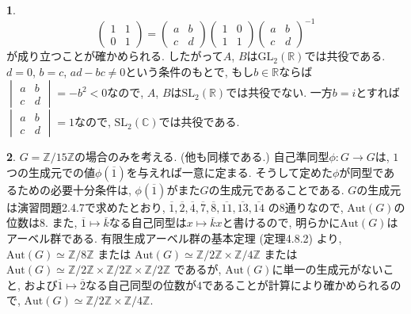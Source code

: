 \documentclass{article}
\theoremstyle{definition}
\newtheorem{ans}{}
\numberwithin{ans}{subsection}
\newcommand{\Z}[1]{\mathbb{Z}/#1\mathbb{Z}}
\begin{document}
\begin{ans}
  \[
    \begin{pmatrix}
      1 & 1 \\
      0 & 1
    \end{pmatrix} = \begin{pmatrix}
      a & b \\
      c & d
    \end{pmatrix} \begin{pmatrix}
      1 & 0 \\
      1 & 1
    \end{pmatrix} \begin{pmatrix}
      a & b \\
      c & d
    \end{pmatrix}^{-1}
  \]
  が成り立つことが確かめられる.
  したがって$A$, $B$は$\mathrm{GL}_2(\mathbb{R})$では共役である.
  $d = 0$, $b = c$, $ad - bc \neq 0$という条件のもとで, もし$b \in \mathbb{R}$ならば$
  \begin{vmatrix}
    a & b \\
    c & d
  \end{vmatrix} = - b^2 < 0
  $なので, $A$, $B$は$\mathrm{SL}_2(\mathbb{R})$では共役でない.
  一方$b = i$とすれば$
  \begin{vmatrix}
    a & b \\
    c & d
  \end{vmatrix} = 1
  $なので, $\mathrm{SL}_2(\mathbb{C})$では共役である.
\end{ans}

\begin{ans}
  $G = \Z{15}$の場合のみを考える. (他も同様である.)
  自己準同型$\phi: G \rightarrow G$は,
  $1$つの生成元での値$\phi(\overline{1})$を与えれば一意に定まる.
  そうして定めた$\phi$が同型であるための必要十分条件は, $\phi(\overline{1})$がまた$G$の生成元であることである.
  $G$の生成元は演習問題2.4.7で求めたとおり,
  $\overline{1}, \overline{2}, \overline{4}, \overline{7}, \overline{8}, \overline{11}, \overline{13}, \overline{14}$
  の$8$通りなので, $\mathrm{Aut}(G)$の位数は$8$.
  また, $\overline{1} \mapsto \overline{k}$なる自己同型は$x \mapsto \overline{k}x$と書けるので,
  明らかに$\mathrm{Aut}(G)$はアーベル群である.
  有限生成アーベル群の基本定理 (定理4.8.2) より,
  $\mathrm{Aut}(G) \simeq \Z{8}$
  または
  $\mathrm{Aut}(G) \simeq \Z{2} \times \Z{4}$
  または
  $\mathrm{Aut}(G) \simeq \Z{2} \times \Z{2} \times \Z{2}$
  であるが, $\mathrm{Aut}(G)$に単一の生成元がないこと,
  および$\overline{1} \mapsto \overline{2}$なる自己同型の位数が$4$であることが計算により確かめられるので,
  $\mathrm{Aut}(G) \simeq \Z{2} \times \Z{4}$.
\end{ans}
\end{document}

